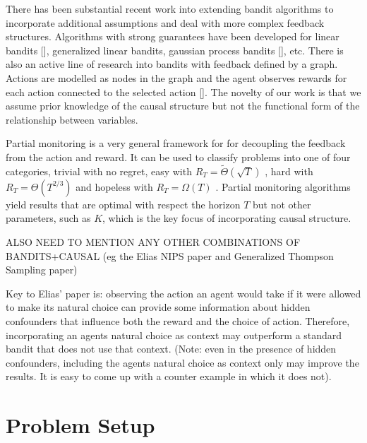 \documentclass{article}
\newcommand{\bigtheta}[1]{\Theta\left( #1 \right)}
\newcommand{\bigthetatilde}[1]{\tilde{\Theta}\left( #1 \right)}
\newcommand{\bigomega}[1]{\Omega\left( #1 \right)}
\theoremstyle{plain}
\theoremstyle{definition}
\begin{document}
There has been substantial recent work into extending bandit algorithms to incorporate additional assumptions and deal with more complex feedback structures. Algorithms with strong guarantees have been developed for linear bandits [], generalized linear bandits, gaussian process bandits [], etc. There is also an active line of research into bandits with feedback defined by a graph. Actions are modelled as nodes in the graph and the agent observes rewards for each action connected to the selected action []. The novelty of our work is that we assume prior knowledge of the causal structure but not the functional form of the relationship between variables.   

Partial monitoring is a very general framework for for decoupling the feedback from the action and reward. It can be used to classify problems into one of four categories, trivial with no regret, easy with $R_T = \bigthetatilde{\sqrt{T}}$ , hard with $R_T = \bigtheta{T^{2/3}}$ and hopeless with $R_T = \bigomega{T}$ \cite{Bartok2014}. Partial monitoring algorithms yield results that are optimal with respect the horizon $T$ but not other parameters, such as $K$, which is the key focus of incorporating causal structure. 

ALSO NEED TO MENTION ANY OTHER COMBINATIONS OF BANDITS+CAUSAL (eg the Elias NIPS paper and Generalized Thompson Sampling paper)

Key to Elias' paper is: observing the action an agent would take if it were allowed to make its natural choice can provide some information about hidden confounders that influence both the reward and the choice of action. Therefore, incorporating an agents natural choice as context may outperform a standard bandit that does not use that context. (Note: even in the presence of hidden confounders, including the agents natural choice as context only may improve the results. It is easy to come up with a counter example in which it does not).

\section{Problem Setup}

\newcommand{\bernoulli}{\operatorname{Bernoulli}}
\newcommand{\dirac}{\operatorname{Dirac}}
\end{document}
